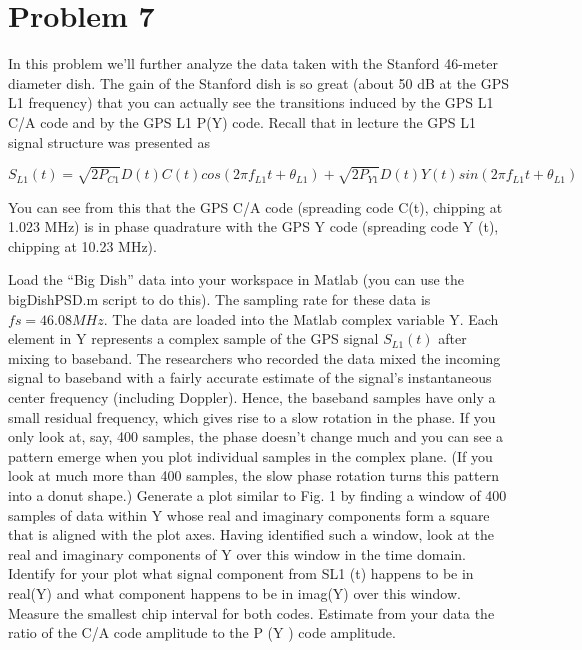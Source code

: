 \section{Problem 7}

In this problem we’ll further analyze the data taken with the Stanford 46-meter
diameter dish. The gain of the Stanford dish is so great (about 50 dB at the GPS
L1 frequency) that you can actually see the transitions induced by the GPS L1
C/A code and by the GPS L1 P(Y) code. Recall that in lecture the GPS L1 signal
structure was presented as

\begin{equation}
	S_{L1} (t) = \sqrt{2P_{C1}} D(t) C(t) cos(2 \pi f_{L1} t + \theta_{L1} ) +
	\sqrt{2P_{Y1}} D(t) Y(t) sin(2 \pi f_{L1} t + \theta_{L1} )
\end{equation}

You can see from this that the GPS C/A code (spreading code C(t), chipping at
1.023 MHz) is in phase quadrature with the GPS Y code (spreading code Y (t),
chipping at 10.23 MHz).

Load the “Big Dish” data into your workspace in Matlab (you can use the
bigDishPSD.m script to do this). The sampling rate for these data is
$fs = 46.08 MHz$. The data are loaded into the Matlab complex variable Y. Each
element in Y represents a complex sample of the GPS signal $S_{L1}(t)$ after
mixing to baseband. The researchers who recorded the data mixed the incoming
signal to baseband with a fairly accurate estimate of the signal’s instantaneous
center frequency (including Doppler). Hence, the baseband samples have only a
small residual frequency, which gives rise to a slow rotation in the phase. If
you only look at, say, 400 samples, the phase doesn’t change much and you can
see a pattern emerge when you plot individual samples in the complex plane. (If
you look at much more than 400 samples, the slow phase rotation turns this
pattern into a donut shape.) Generate a plot similar to Fig. 1 by finding a
window of 400 samples of data within Y whose real and imaginary components form
a square that is aligned with the plot axes. Having identified such a window,
look at the real and imaginary components of Y over this window in the time
domain. Identify for your plot what signal component from SL1 (t) happens to be
in real(Y) and what component happens to be in imag(Y) over this window. Measure
the smallest chip interval for both codes. Estimate from your data the ratio of
the C/A code amplitude to the P (Y ) code amplitude.

